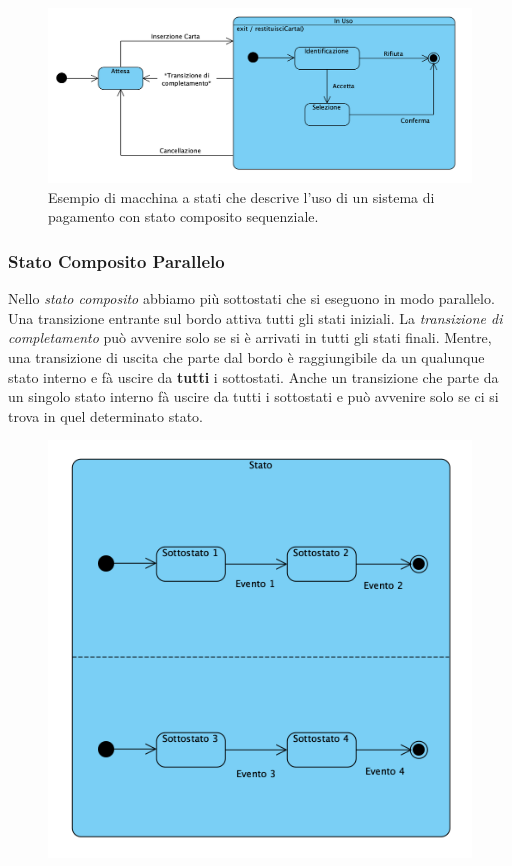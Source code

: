 \begin{figure}[H]
    \captionsetup{justification=centering}
    \centering
    \includegraphics[scale=0.45]{img/statocompositoseq.png}
    \caption{Esempio di macchina a stati che descrive l'uso di un sistema di pagamento con stato composito sequenziale.}
\end{figure}

\newpage

\subsubsection{Stato Composito Parallelo}
Nello \emph{stato composito} abbiamo più sottostati che si eseguono in modo
parallelo. Una transizione entrante sul bordo attiva tutti gli stati iniziali.
La \emph{transizione di completamento} può avvenire solo se si è arrivati in tutti gli stati finali.
Mentre, una transizione di uscita che parte dal bordo è raggiungibile da un qualunque stato interno e fà uscire da \textbf{tutti}
i sottostati. Anche un transizione che parte da un singolo stato interno fà uscire da tutti i sottostati e può avvenire solo se ci
si trova in quel determinato stato.

\begin{figure}[H]
    \centering
    \includegraphics[scale=0.6]{img/statoparallelo.png}
\end{figure}

